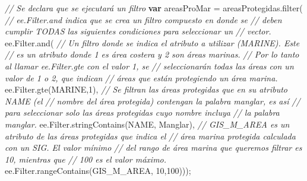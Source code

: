 \documentclass[
  12pt,
  letterpaper,
  twoside]{book}
\newenvironment{Shaded}{\begin{snugshade}}{\end{snugshade}}
\newcommand{\AttributeTok}[1]{\textcolor[rgb]{0.48,0.12,0.64}{#1}}
\newcommand{\CommentTok}[1]{\textcolor[rgb]{0.24,0.58,0.00}{\textit{#1}}}
\newcommand{\DecValTok}[1]{\textcolor[rgb]{0.28,0.53,0.93}{#1}}
\newcommand{\FunctionTok}[1]{\textcolor[rgb]{0.48,0.12,0.64}{#1}}
\newcommand{\KeywordTok}[1]{\textcolor[rgb]{0.00,0.00,0.00}{\textbf{#1}}}
\newcommand{\NormalTok}[1]{#1}
\newcommand{\OperatorTok}[1]{\textcolor[rgb]{0.00,0.00,0.00}{#1}}
\newcommand{\StringTok}[1]{\textcolor[rgb]{0.87,0.29,0.22}{#1}}
\begin{document}
\begin{Shaded}
\begin{Highlighting}[]
\CommentTok{// Se declara que se ejecutará un filtro}
\KeywordTok{var}\NormalTok{ areasProMar }\OperatorTok{=}\NormalTok{ areasProtegidas}\OperatorTok{.}\FunctionTok{filter}\NormalTok{( }
  \CommentTok{// ee.Filter.and indica que se crea un filtro compuesto en donde se }
  \CommentTok{// deben cumplir TODAS las siguientes condiciones para seleccionar un }
  \CommentTok{// vector.}
\NormalTok{  ee}\OperatorTok{.}\AttributeTok{Filter}\OperatorTok{.}\FunctionTok{and}\NormalTok{(    }
  \CommentTok{// Un filtro donde se indica el atributo a utilizar (\textquotesingle{}MARINE\textquotesingle{}). Este }
  \CommentTok{// es un atributo donde 1 es área costera y 2 son áreas marinas.}
  \CommentTok{// Por lo tanto al llamar ee.Filter.gte con el valor 1, se }
  \CommentTok{// seleccionarán todas las áreas con un valor de 1 o 2, que indican}
  \CommentTok{// áreas que están protegiendo un área marina.}
\NormalTok{  ee}\OperatorTok{.}\AttributeTok{Filter}\OperatorTok{.}\FunctionTok{gte}\NormalTok{(}\StringTok{\textquotesingle{}MARINE\textquotesingle{}}\OperatorTok{,}\DecValTok{1}\NormalTok{)}\OperatorTok{,}   
  \CommentTok{// Se filtran las áreas protegidas que en su atributo \textquotesingle{}NAME\textquotesingle{} (el }
  \CommentTok{// nombre del área protegida) contengan la  palabra \textquotesingle{}manglar\textquotesingle{}, es así}
  \CommentTok{// para seleccionar solo las áreas protegidas cuyo nombre incluya }
  \CommentTok{// la palabra manglar.}
\NormalTok{  ee}\OperatorTok{.}\AttributeTok{Filter}\OperatorTok{.}\FunctionTok{stringContains}\NormalTok{(}\StringTok{\textquotesingle{}NAME\textquotesingle{}}\OperatorTok{,} \StringTok{\textquotesingle{}Manglar\textquotesingle{}}\NormalTok{)}\OperatorTok{,}
  \CommentTok{// \textquotesingle{}GIS\_M\_AREA\textquotesingle{} es un atributo de las áreas protegidas que indica el }
  \CommentTok{// área marina protegida calculada con un SIG. El valor mínimo }
  \CommentTok{// del rango de área marina que queremos filtrar es 10, mientras que }
  \CommentTok{// 100 es el valor máximo.}
\NormalTok{  ee}\OperatorTok{.}\AttributeTok{Filter}\OperatorTok{.}\FunctionTok{rangeContains}\NormalTok{(}\StringTok{\textquotesingle{}GIS\_M\_AREA\textquotesingle{}}\OperatorTok{,} \DecValTok{10}\OperatorTok{,}\DecValTok{100}\NormalTok{)))}\OperatorTok{;} 
\end{Highlighting}
\end{Shaded}
\end{document}
